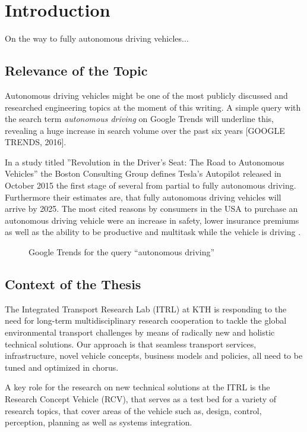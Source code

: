 \chapter{Introduction}
On the way to fully autonomous driving vehicles...

\section{Relevance of the Topic}
Autonomous driving vehicles might be one of the most publicly discussed and researched engineering topics at the moment of this writing. A simple query with the search term \emph{autonomous driving} on Google Trends will underline this, revealing a huge increase in search volume over the past six years [GOOGLE TRENDS, 2016].

In a study titled ''Revolution in the Driver's Seat: The Road to Autonomous Vehicles'' the Boston Consulting Group defines Tesla's Autopilot released in October 2015 the first stage of several from partial to fully autonomous driving. Furthermore their estimates are, that fully autonomous driving vehicles will arrive by 2025. The most cited reasons by consumers in the USA to purchase an autonomous driving vehicle were an increase in safety, lower insurance premiums as well as the ability to be productive and multitask while the vehicle is driving \cite{XavierMosquet.2015}.

\begin{figure}[h]
\caption{Google Trends for the query ``autonomous driving''}
\label{fig:GoogleTrends}
\end{figure}

\section{Context of the Thesis}
The Integrated Transport Research Lab (ITRL) at KTH is responding to the need for long-term multidisciplinary research cooperation to tackle the global environmental transport challenges by means of radically new and holistic technical solutions. Our approach is that seamless transport services, infrastructure, novel vehicle concepts, business models and policies, all need to be tuned and optimized in chorus.

A key role for the research on new technical solutions at the ITRL is the Research Concept Vehicle (RCV), that serves as a test bed for a variety of research topics, that cover areas of the vehicle such as, design, control, perception, planning as well as systems integration.

